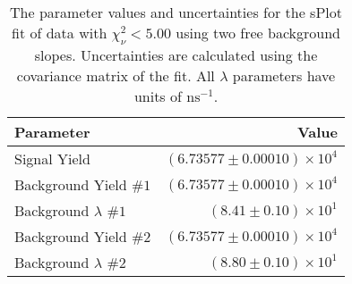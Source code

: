 
\begin{table}[h]
    \begin{center}
        \begin{tabular}{lr}\toprule
            Parameter & Value \\\midrule
            Signal Yield & $(6.73577 \pm 0.00010) \times 10^{4}$ \\
            Background Yield $\#1$ & $(6.73577 \pm 0.00010) \times 10^{4}$ \\
            Background $\lambda$ $\#1$ & $(8.41 \pm 0.10) \times 10^{1}$ \\
            Background Yield $\#2$ & $(6.73577 \pm 0.00010) \times 10^{4}$ \\
            Background $\lambda$ $\#2$ & $(8.80 \pm 0.10) \times 10^{1}$ \\\bottomrule
        \end{tabular}
        \caption{The parameter values and uncertainties for the sPlot fit of data with $\chi^2_\nu < 5.00$ using two free background slopes. Uncertainties are calculated using the covariance matrix of the fit. All $\lambda$ parameters have units of $\si{\nano\second}^{-1}$.}
    \end{center}
\end{table}
